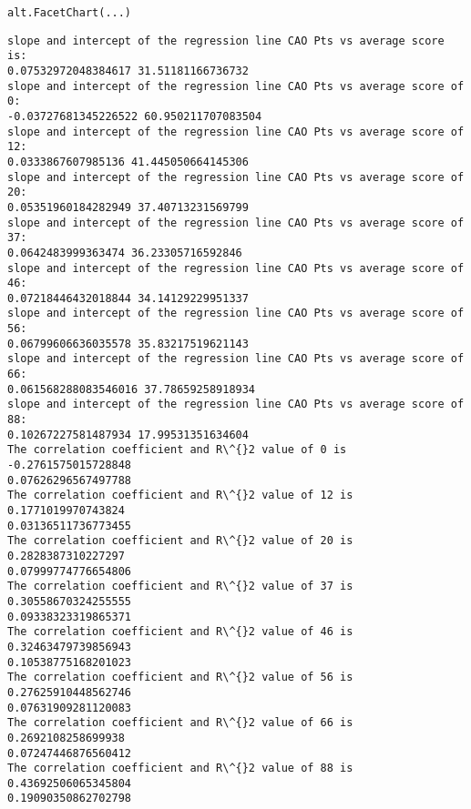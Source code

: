 \documentclass[11pt]{article}
\begin{document}
    
    \begin{verbatim}
alt.FacetChart(...)
    \end{verbatim}

    
    \begin{Verbatim}[commandchars=\\\{\}]
slope and intercept of the regression line CAO Pts vs average score is:
0.07532972048384617 31.51181166736732
slope and intercept of the regression line CAO Pts vs average score of 0:
-0.03727681345226522 60.950211707083504
slope and intercept of the regression line CAO Pts vs average score of 12:
0.0333867607985136 41.445050664145306
slope and intercept of the regression line CAO Pts vs average score of 20:
0.05351960184282949 37.40713231569799
slope and intercept of the regression line CAO Pts vs average score of 37:
0.0642483999363474 36.23305716592846
slope and intercept of the regression line CAO Pts vs average score of 46:
0.07218446432018844 34.14129229951337
slope and intercept of the regression line CAO Pts vs average score of 56:
0.06799606636035578 35.83217519621143
slope and intercept of the regression line CAO Pts vs average score of 66:
0.061568288083546016 37.78659258918934
slope and intercept of the regression line CAO Pts vs average score of 88:
0.10267227581487934 17.99531351634604
The correlation coefficient and R\^{}2 value of 0 is  -0.2761575015728848
0.07626296567497788
The correlation coefficient and R\^{}2 value of 12 is  0.1771019970743824
0.03136511736773455
The correlation coefficient and R\^{}2 value of 20 is  0.2828387310227297
0.07999774776654806
The correlation coefficient and R\^{}2 value of 37 is  0.30558670324255555
0.09338323319865371
The correlation coefficient and R\^{}2 value of 46 is  0.32463479739856943
0.10538775168201023
The correlation coefficient and R\^{}2 value of 56 is  0.27625910448562746
0.07631909281120083
The correlation coefficient and R\^{}2 value of 66 is  0.2692108258699938
0.07247446876560412
The correlation coefficient and R\^{}2 value of 88 is  0.43692506065345804
0.19090350862702798
    \end{Verbatim}
\end{document}
